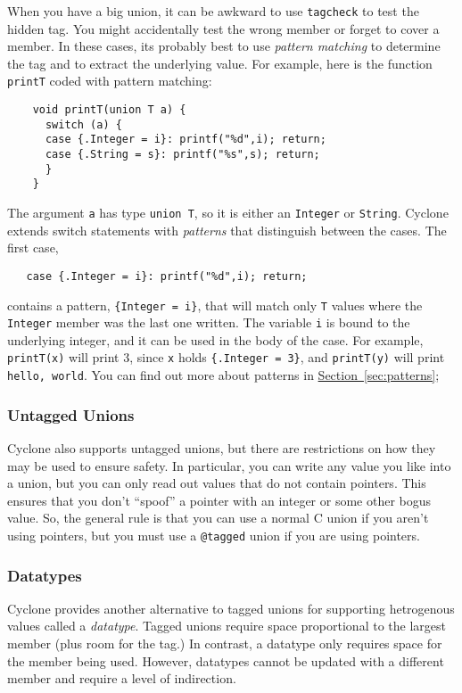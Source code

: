 When you have a big union, it can be awkward to use \texttt{tagcheck}
to test the hidden tag.  You might accidentally test the wrong
member or forget to cover a member.  In these cases, its probably
best to use \emph{pattern matching} to determine the tag and 
to extract the underlying value.  For
example, here is the function \texttt{printT} coded with
pattern matching:
\begin{verbatim}
    void printT(union T a) {
      switch (a) {
      case {.Integer = i}: printf("%d",i); return;
      case {.String = s}: printf("%s",s); return;
      }
    }
\end{verbatim}
The argument \texttt{a} has type \texttt{union T}, so it is either
an \texttt{Integer} or \texttt{String}.  Cyclone
extends switch statements with \emph{patterns} that distinguish
between the cases.  The first case,
\begin{verbatim}
   case {.Integer = i}: printf("%d",i); return;
\end{verbatim}
contains a pattern, \texttt{\{Integer = i\}}, that will match only 
\texttt{T} values where the \texttt{Integer} member was the last
one written.  The variable
\texttt{i} is bound to the underlying integer, and it can be used in
the body of the case.  For example, \texttt{printT(x)} will print 3,
since \texttt{x} holds \texttt{\{.Integer = 3\}}, and
\texttt{printT(y)} will print \texttt{hello, world}.
You can find out more about patterns in
\hyperref[{sec:patterns}]{Section~\ref{sec:patterns}}; 

\subsubsection*{Untagged Unions}

Cyclone also supports untagged unions, but there are restrictions
on how they may be used to ensure safety.  In particular, you can
write any value you like into a union, but you can only read out
values that do not contain pointers.  This ensures that you don't
``spoof'' a pointer with an integer or some other bogus value.
So, the general rule is that you can use a normal C union if
you aren't using pointers, but you must use a \texttt{@tagged}
union if you are using pointers.  

\subsubsection*{Datatypes}

Cyclone provides another alternative to tagged unions for supporting
hetrogenous values called a \emph{datatype}.  Tagged
unions require space proportional to the largest member (plus room
for the tag.)  In contrast, a datatype only requires space for the
member being used.  However, datatypes cannot be updated with a
different member and require a level of indirection. 


